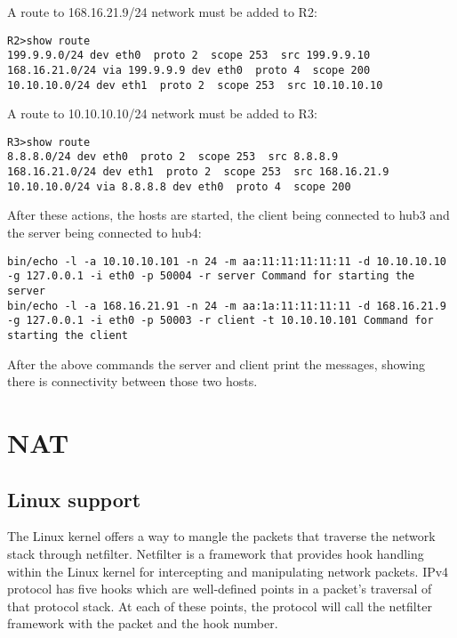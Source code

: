 {{A route to 168.16.21.9/24 network must be added to R2:
\lstset{language=TeX, caption=R2 routing table}
\begin{lstlisting}
R2>show route  
199.9.9.0/24 dev eth0  proto 2  scope 253  src 199.9.9.10 
168.16.21.0/24 via 199.9.9.9 dev eth0  proto 4  scope 200 
10.10.10.0/24 dev eth1  proto 2  scope 253  src 10.10.10.10
\end{lstlisting}

A route to 10.10.10.10/24 network must be added to R3:
\lstset{language=TeX, caption=R3 routing table}
\begin{lstlisting}
R3>show route  
8.8.8.0/24 dev eth0  proto 2  scope 253  src 8.8.8.9 
168.16.21.0/24 dev eth1  proto 2  scope 253  src 168.16.21.9 
10.10.10.0/24 via 8.8.8.8 dev eth0  proto 4  scope 200
\end{lstlisting}

After these actions, the hosts are started, the client being connected to hub3 and the server being connected to hub4:
\lstset{language=TeX, caption=Commands issued for starting client and server}
\begin{lstlisting}
bin/echo -l -a 10.10.10.101 -n 24 -m aa:11:11:11:11:11 -d 10.10.10.10 -g 127.0.0.1 -i eth0 -p 50004 -r server Command for starting the server
bin/echo -l -a 168.16.21.91 -n 24 -m aa:1a:11:11:11:11 -d 168.16.21.9 -g 127.0.0.1 -i eth0 -p 50003 -r client -t 10.10.10.101 Command for starting the client
\end{lstlisting}
After the above commands the server and client print the messages, showing there is connectivity between those two hosts.
\section{NAT}
\label{sub-sec:nat-impl}

\subsection{Linux support}
\label{sub-sec:nat-linux}
The Linux kernel offers a way to mangle the packets that traverse the network stack through netfilter. 
Netfilter is a framework that provides hook handling within the Linux kernel for intercepting and 
manipulating network packets. IPv4 protocol has five hooks which are well-defined points in a packet's 
traversal of that protocol stack. At each of these points, the protocol will call the netfilter framework 
with the packet and the hook number.
\\

}}
